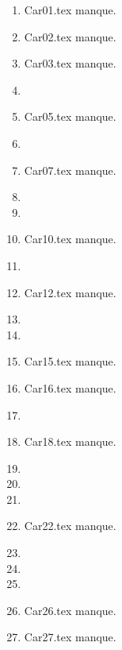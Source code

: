 \begin{enumerate}
  \item Car01.tex manque. 
  \item Car02.tex manque. 
  \item Car03.tex manque. 
  \item  
  \item Car05.tex manque. 
  \item  
  \item Car07.tex manque. 
  \item  
  \item  
  \item Car10.tex manque. 
  \item  
  \item Car12.tex manque. 
  \item  
  \item  
  \item Car15.tex manque. 
  \item Car16.tex manque. 
  \item  
  \item Car18.tex manque. 
  \item  
  \item  
  \item  
  \item Car22.tex manque. 
  \item  
  \item  
  \item  
  \item Car26.tex manque. 
  \item Car27.tex manque. 
\end{enumerate} 
